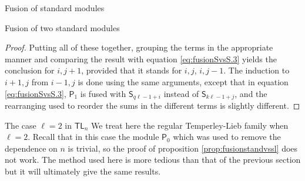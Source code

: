 \documentclass[reqno]{amsart}
\newcommand{\tl}[1]{\mathsf{TL}_{#1}}
\newcommand{\ds}[1]{\mathsf S_{#1}}
\newcommand{\dP}[1]{\mathsf P_{#1}}
\newcommand{\lc}{\ell}
\begin{document}
\begin{section}{Fusion of standard modules}
\begin{subsection}{Fusion of two standard modules}
\begin{proof}
Putting all of these together, grouping the terms in the appropriate manner and comparing the result with equation \eqref{eq:fusionSvsS.3} yields the conclusion for $i, j+1$, provided that it stands for $i,j$, $i,j-1$. The induction to $i+1,j$ from $i-1,j$ is done using the same arguments, except that in equation \eqref{eq:fusionSvsS.3}, $\dP{1}$ is fused with $\ds{q \lc-1 +i}$ instead of $\ds{k \lc-1 +j}$, and the rearranging used to reorder the sums in the different terms is slightly different.
\end{proof}
\end{subsection}
\begin{subsection}{The case $\lc =2$ in $\tl{n}$}\label{sec:tl_l2}
We treat here the regular Temperley-Lieb family when $\lc =2$. Recall that in this case the module $\dP{0}$ which was used to remove the dependence on $n$ is trivial, so the proof of proposition \ref{prop:fusionstandvssl} does not work. The method used here is more tedious than that of the previous section but it will ultimately give the same results.


\end{subsection}
\end{section}
\end{document}
